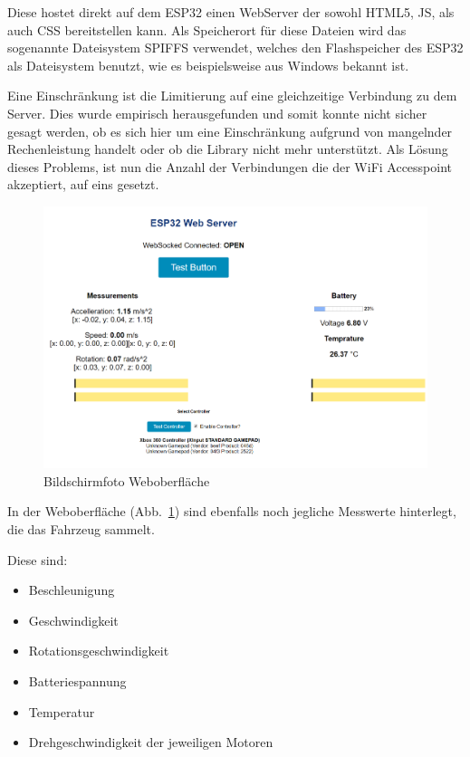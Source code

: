 Diese hostet direkt auf dem ESP32 einen WebServer der sowohl HTML5, JS, als auch CSS bereitstellen kann. Als Speicherort für diese Dateien wird das sogenannte Dateisystem SPIFFS verwendet, welches den Flashspeicher des ESP32 als Dateisystem benutzt, wie es beispielsweise aus Windows bekannt ist.\par

Eine Einschränkung ist die Limitierung auf eine gleichzeitige Verbindung zu dem Server. Dies wurde empirisch herausgefunden und somit konnte nicht sicher gesagt werden, ob es sich hier um eine Einschränkung aufgrund von mangelnder Rechenleistung handelt oder ob die Library nicht mehr unterstützt. Als Lösung dieses Problems, ist nun die Anzahl der Verbindungen die der WiFi Accesspoint akzeptiert, auf eins gesetzt.\par


\vspace{\baselineskip}

\begin{figure}[!ht]
	\centering
	\includegraphics[width=\textwidth]{bilder/WebValues.png}
	\caption{Bildschirmfoto Weboberfläche}
	\label{bild:webvalues}
\end{figure}

In der Weboberfläche (Abb.~\ref{bild:webvalues}) sind ebenfalls noch jegliche Messwerte hinterlegt, die das Fahrzeug sammelt.\par

Diese sind:\par

\begin{itemize}
	\item Beschleunigung 
	\item Geschwindigkeit
	\item Rotationsgeschwindigkeit
	\item Batteriespannung
	\item Temperatur
	\item Drehgeschwindigkeit der jeweiligen Motoren
\end{itemize}\par


